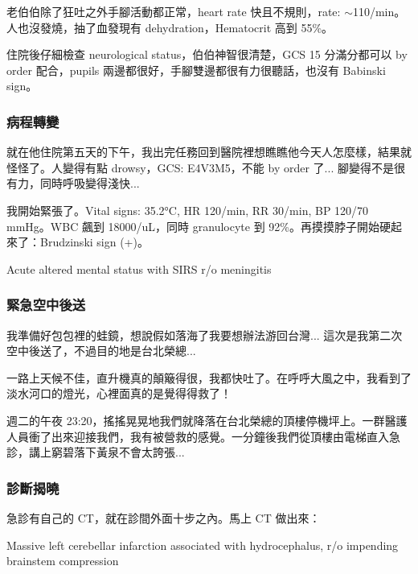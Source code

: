 \documentclass[12pt,a4paper]{article}
\begin{document}
老伯伯除了狂吐之外手腳活動都正常，heart rate 快且不規則，rate: $\sim$110/min。人也沒發燒，抽了血發現有 dehydration，Hematocrit 高到 55\%。

住院後仔細檢查 neurological status，伯伯神智很清楚，GCS 15 分滿分都可以 by order 配合，pupils 兩邊都很好，手腳雙邊都很有力很聽話，也沒有 Babinski sign。

\subsubsection{病程轉變}

就在他住院第五天的下午，我出完任務回到醫院裡想瞧瞧他今天人怎麼樣，結果就怪怪了。人變得有點 drowsy，GCS: E4V3M5，不能 by order 了... 腳變得不是很有力，同時呼吸變得淺快...

我開始緊張了。Vital signs: 35.2°C, HR 120/min, RR 30/min, BP 120/70 mmHg。WBC 飆到 18000/uL，同時 granulocyte 到 92\%。再摸摸脖子開始硬起來了：Brudzinski sign (+)。

\begin{tcolorbox}[
    colback=emergency_blue!10!white,
    colframe=emergency_blue,
    title=\textbf{Impression},
    fonttitle=\bfseries
]
Acute altered mental status with SIRS r/o meningitis
\end{tcolorbox}

\subsubsection{緊急空中後送}

我準備好包包裡的蛙鏡，想說假如落海了我要想辦法游回台灣... 這次是我第二次空中後送了，不過目的地是台北榮總...

一路上天候不佳，直升機真的顛簸得很，我都快吐了。在呼呼大風之中，我看到了淡水河口的燈光，心裡面真的是覺得得救了！

週二的午夜 23:20，搖搖晃晃地我們就降落在台北榮總的頂樓停機坪上。一群醫護人員衝了出來迎接我們，我有被營救的感覺。一分鐘後我們從頂樓由電梯直入急診，講上窮碧落下黃泉不會太誇張...

\subsubsection{診斷揭曉}

急診有自己的 CT，就在診間外面十步之內。馬上 CT 做出來：

\begin{tcolorbox}[
    colback=emergency_red!10!white,
    colframe=emergency_red,
    title=\textbf{Diagnosis},
    fonttitle=\bfseries
]
Massive left cerebellar infarction associated with hydrocephalus, r/o impending brainstem compression
\end{tcolorbox}
\end{document}
